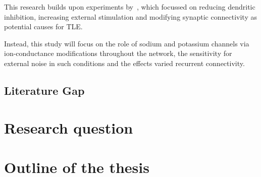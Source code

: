 This research builds upon experiments by~\textcite{sanjayImpairedDendriticInhibition2015}, 
which focussed on reducing dendritic inhibition, increasing external stimulation and modifying synaptic connectivity as potential causes for TLE\@.

Instead, this study will focus on the role of sodium and potassium channels via ion-conductance modifications throughout the network, 
the sensitivity for external noise in such conditions and the effects varied recurrent connectivity.

\subsection{Literature Gap}

\section{Research question}

\section{Outline of the thesis}